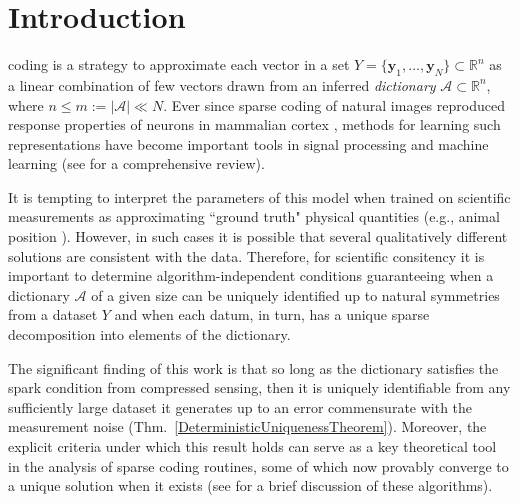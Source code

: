 \documentclass[journal, twocolumn]{IEEEtran}
\begin{document}

\section{Introduction}
 coding is a strategy to approximate each vector in a set $Y = \{\mathbf{y}_1, \ldots, \mathbf{y}_N\} \subset \mathbb{R}^n$ as a linear combination of few vectors drawn from an inferred \emph{dictionary} $\mathcal{A} \subset \mathbb{R}^n$, where $n \leq m:= |\mathcal{A}| \ll N$. Ever since sparse coding of natural images reproduced response properties of neurons in mammalian cortex \cite{Olshausen96}, methods for learning such representations have become important tools in signal processing and machine learning (see \cite{Zhang15} for a comprehensive review). 

It is tempting to interpret the parameters of this model when trained on scientific measurements as approximating ``ground truth" physical quantities (e.g., animal position \cite{Agarwal14}).
However, in such cases it is possible that several qualitatively different solutions are consistent with the data. Therefore, for scientific consitency it is important to determine algorithm-independent conditions guaranteeing when a dictionary $\mathcal{A}$ of a given size can be uniquely identified up to natural symmetries from a dataset $Y$ and when each datum, in turn, has a unique sparse decomposition into elements of the dictionary. 

The significant finding of this work is that so long as the dictionary satisfies the spark condition from compressed sensing, then it is uniquely identifiable from any sufficiently large dataset it generates up to an error commensurate with the measurement noise (Thm.~\ref{DeterministicUniquenessTheorem}).
Moreover, the explicit criteria under which this result holds can serve as a key theoretical tool in the analysis of sparse coding routines, some of which now provably converge to a unique solution when it exists (see \cite[Sec.~I-E]{Sun16} for a brief discussion of these algorithms). 
\end{document}
